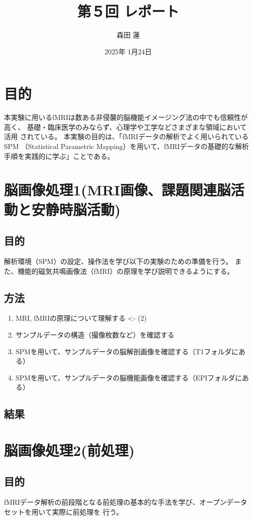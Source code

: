 \documentclass{jlreq}
\title{第５回 レポート}
\author{森田 蓮}
\date{2025年 1月24日}
\begin{document}
\maketitle

\section{目的}
本実験に用いるfMRIは数ある非侵襲的脳機能イメージング法の中でも信頼性が高く、
基礎・臨床医学のみならず、心理学や工学などさまざまな領域において活用
されている。
本実験の目的は、「fMRIデータの解析でよく用いられているSPM
（Statistical Parametric Mapping）を用いて、fMRIデータの基礎的な解析
手順を実践的に学ぶ」ことである。

\section{脳画像処理1(MRI画像、課題関連脳活動と安静時脳活動)}
\subsection{目的}
解析環境（SPM）の設定、操作法を学び以下の実験のための準備を行う。
また、機能的磁気共鳴画像法（fMRI）の原理を学び説明できるようにする。
\subsection{方法}
\begin{enumerate}
    \item MRI, fMRIの原理について理解する <- (2)
    \item サンプルデータの構造（撮像枚数など）を確認する
    \item SPMを用いて、サンプルデータの脳解剖画像を確認する（T1フォルダにある）
    \item SPMを用いて、サンプルデータの脳機能画像を確認する（EPIフォルダにある）
\end{enumerate}
\subsection{結果}

\section{脳画像処理2(前処理)}
\subsection{目的}
fMRIデータ解析の前段階となる前処理の基本的な手法を学び、オープンデータセットを用いて実際に前処理を
行う。
\end{document}
